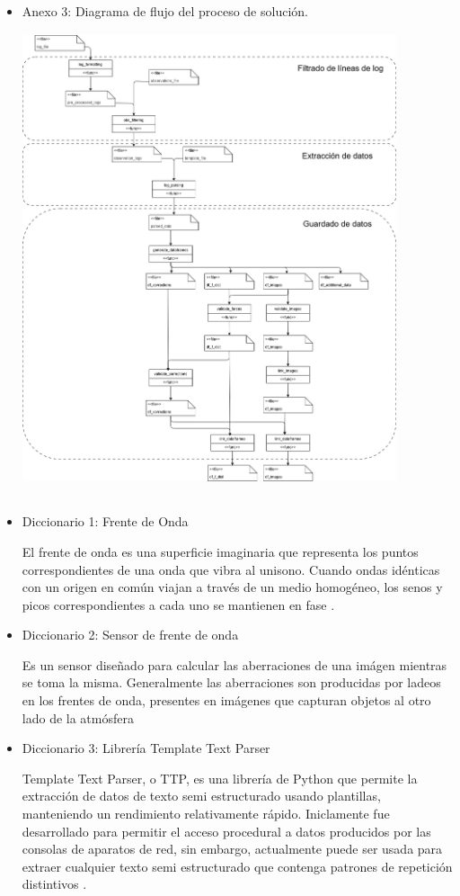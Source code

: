 \begin{itemize}
    \item Anexo 3: Diagrama de flujo del proceso de solución.
        \\
        \includegraphics[width=11cm,height=14cm]{figures/flow_diagram.png} \\

\end{itemize}


\begin{itemize}
    \item Diccionario 1: Frente de Onda

    El frente de onda es una superficie imaginaria que representa los puntos correspondientes de una onda que vibra al unisono. Cuando ondas idénticas con un origen en común viajan a través de un medio homogéneo, los senos y picos correspondientes a cada uno se mantienen en fase \cite{britannica2022front}. 

    \item Diccionario 2: Sensor de frente de onda

    Es un sensor diseñado para calcular las aberraciones de una imágen mientras se toma la misma. Generalmente las aberraciones son producidas por ladeos en los frentes de onda, presentes en imágenes que capturan objetos al otro lado de la atmósfera \cite{platt2001sh}

     \item Diccionario 3: Librería Template Text Parser

     Template Text Parser, o TTP, es una librería de Python que permite la extracción de datos de texto semi estructurado usando plantillas, manteniendo un rendimiento relativamente rápido. Iniclamente fue desarrollado para permitir el acceso procedural a datos producidos por las consolas de aparatos de red, sin embargo, actualmente puede ser usada para extraer cualquier texto semi estructurado que contenga patrones de repetición distintivos \cite{dmulyalin2021ttp}.
\end{itemize}